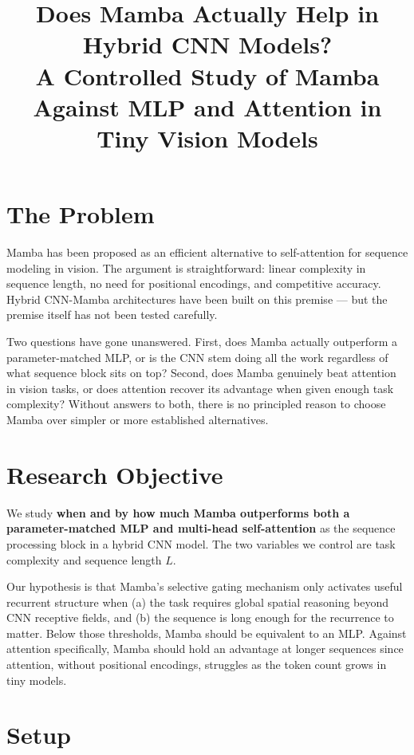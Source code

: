 \documentclass[11pt, a4paper]{article}
\title{\textbf{Does Mamba Actually Help in Hybrid CNN Models?}\\[0.4em]
\large A Controlled Study of Mamba Against MLP and Attention in Tiny Vision Models}
\author{}
\date{}
\begin{document}
\maketitle

\section{The Problem}

Mamba has been proposed as an efficient alternative to self-attention for sequence
modeling in vision. The argument is straightforward: linear complexity in sequence
length, no need for positional encodings, and competitive accuracy. Hybrid CNN-Mamba
architectures have been built on this premise — but the premise itself has not been
tested carefully.

Two questions have gone unanswered. First, does Mamba actually outperform a
parameter-matched MLP, or is the CNN stem doing all the work regardless of what
sequence block sits on top? Second, does Mamba genuinely beat attention in vision
tasks, or does attention recover its advantage when given enough task complexity?
Without answers to both, there is no principled reason to choose Mamba over simpler
or more established alternatives.

\section{Research Objective}

We study \textbf{when and by how much Mamba outperforms both a parameter-matched MLP
and multi-head self-attention} as the sequence processing block in a hybrid CNN model.
The two variables we control are task complexity and sequence length $L$.

Our hypothesis is that Mamba's selective gating mechanism only activates useful
recurrent structure when (a) the task requires global spatial reasoning beyond CNN
receptive fields, and (b) the sequence is long enough for the recurrence to matter.
Below those thresholds, Mamba should be equivalent to an MLP. Against attention
specifically, Mamba should hold an advantage at longer sequences since attention, without
positional encodings, struggles as the token count grows in tiny models.

\section{Setup}
\end{document}
